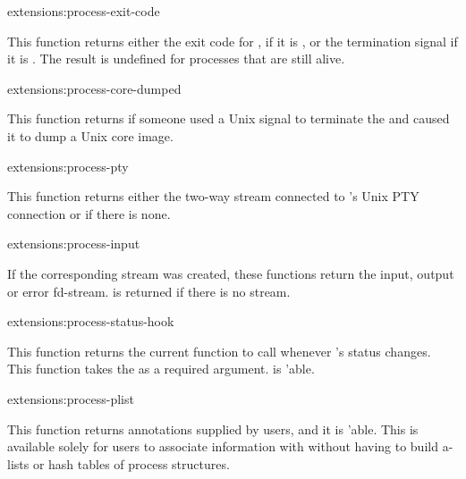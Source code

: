 \begin{defun}{extensions:}{process-exit-code}{}
  
  This function returns either the exit code for , if it
  is , or the termination signal  if it is
  .  The result is undefined for processes that are
  still alive.
\end{defun}

\begin{defun}{extensions:}{process-core-dumped}{}
  
  This function returns \true{} if someone used a Unix signal to
  terminate the  and caused it to dump a Unix core image.
\end{defun}

\begin{defun}{extensions:}{process-pty}{}
  
  This function returns either the two-way stream connected to
  's Unix PTY connection or \nil{} if there is none.
\end{defun}

\begin{defun}{extensions:}{process-input}{}
  
  If the corresponding stream was created, these functions return the
  input, output or error fd-stream.  \nil{} is returned if there
  is no stream.
\end{defun}

\begin{defun}{extensions:}{process-status-hook}{}
  
  This function returns the current function to call whenever
  's status changes.  This function takes the
   as a required argument.   is
  'able.
\end{defun}

\begin{defun}{extensions:}{process-plist}{}
  
  This function returns annotations supplied by users, and it is
  'able.  This is available solely for users to associate
  information with  without having to build a-lists or
  hash tables of process structures.
\end{defun}

